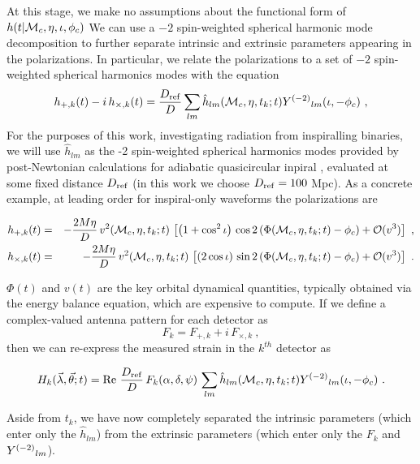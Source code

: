 At this stage, we make no assumptions about the functional form of $h(t|{{\cal M}_c},\eta,\iota,\phi_c)$
%
We can use a $-2$ spin-weighted spherical harmonic mode decomposition to further separate intrinsic and extrinsic
parameters appearing in the polarizations. 
In particular, we relate the polarizations to a set of $-2$ spin-weighted 
spherical harmonics modes with the equation
\begin{equation} \label{eq:h:Expansion}
h_{+,k}(t) - i\,h_{\times,k}(t) = \frac{D_{\rm ref}}{D} \sum_{lm} \hat{h}_{lm}({{\cal M}_c},\eta,t_k;t)  Y^{(-2)}{}_{lm}(\iota,-\phi_c) \ ,
\end{equation}
For the purposes of this work, investigating radiation from inspiralling binaries, we will use $\hat{h}_{lm}$ as the -2
spin-weighted spherical harmonics modes provided by post-Newtonian calculations for adiabatic quasicircular inpiral \cite{gw-astro-mergers-approximations-SpinningPNHigherHarmonics},
evaluated at some fixed distance $D_{\rm ref}$ (in this work we choose $D_{\rm ref} = 100$ Mpc).
%
As a concrete example, at leading order for inspiral-only waveforms the polarizations are
\begin{widetext}
\begin{eqnarray} \label{eq:polarizations}
h_{+,k}(t) &=& - \frac{2 M \eta}{D}\,v^2({{\cal M}_c},\eta,t_k;t)\,\left[ \left( 1 + \cos^2 \iota \right)\, \label{eq:h+}
	\cos 2 \left( \Phi({{\cal M}_c},\eta,t_k;t) - \phi_c \right) + {\cal O}(v^3)\right]\ ,\\
h_{\times,k}(t) &=& - \frac{2 M \eta}{D}\,v^2({{\cal M}_c},\eta,t_k;t)\,\left[ \left( 2 \cos \iota\right)\, \label{eq:hx}
	\sin 2 \left( \Phi({{\cal M}_c},\eta,t_k;t) - \phi_c \right) + {\cal O}(v^3)\right]\ .
\end{eqnarray}
\end{widetext}
$\Phi(t)$ and $v(t)$ are the key orbital dynamical quantities, typically obtained via the energy balance equation,
which are expensive to compute.
%
If we define a complex-valued antenna pattern for each detector as
\begin{equation} \label{eq:complexF}
F_k = F_{+,k} + i \, F_{\times,k} \ ,
\end{equation}
then we can re-express the measured strain in the $k^{th}$ detector as
\begin{widetext}
\begin{equation} \label{eq:decomposed_strain}
H_k(\vec{\lambda},\vec{\theta};t) = {\rm Re}\ \frac{D_{\rm ref}}{D}\, F_k(\alpha,\delta,\psi) \, \sum_{lm} 
\hat{h}_{lm}({{\cal M}_c},\eta,t_k;t)  Y^{(-2)}{}_{lm}(\iota,-\phi_c)\ .
\end{equation}
\end{widetext}
Aside from $t_k$, we have now completely separated the intrinsic parameters (which enter only the $\hat{h}_{lm}$)
from the extrinsic parameters (which enter only the $F_k$ and $Y^{(-2)}{}_{lm}$).
